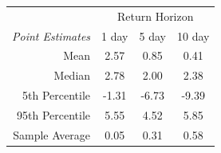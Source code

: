 \begin{tabular}{r | c c c}
\toprule 
& \multicolumn{3}{c}{Return Horizon} \\
\multicolumn{1}{l|}{\textit{Point Estimates}} & 1 day & 5 day & 10 day \\
\midrule 
Mean & 2.57 & 0.85 & 0.41 \\
Median & 2.78 & 2.00 & 2.38 \\
5th Percentile & -1.31 & -6.73 & -9.39 \\
95th Percentile & 5.55 & 4.52 & 5.85 \\
\midrule \midrule
Sample Average & 0.05 & 0.31 & 0.58 \\  
\bottomrule
\end{tabular}